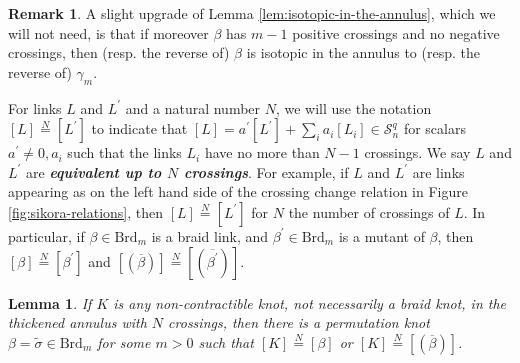 \documentclass[12pt,
	]{amsart}
\newtheorem{lemma}[theorem]{Lemma}
\theoremstyle{definition}
\newtheorem{remark}[theorem]{Remark}
\renewcommand{\bar}{\overline}
\renewcommand{\tilde}{\widetilde}
\newcommand{\mrm}[1]{\mathrm{#1}}
\newcommand{\mcal}[1]{\mathcal{#1}}
\newcommand{\lp}{\left(}\newcommand{\rp}{\right)}
\newcommand{\define}[1]{{\textit{\textbf{#1}}}}
\newcommand{\class}[1]{\left[#1\right]}
\newcommand{\rev}[1]{\bar{#1}}
\newcommand{\lift}[1]{\tilde{#1}}
\newcommand{\sk}{\mcal{S}_n^q}
\newcommand{\braid}{\mrm{Brd}}
\newcommand{\indeq}{\overset{N}{=}}
\begin{document}
\begin{remark}
A slight upgrade of Lemma \ref{lem:isotopic-in-the-annulus}, which we will not need, is that if moreover $\beta$ has $m-1$ positive crossings and no negative crossings, then (resp. the reverse of) $\beta$ is isotopic in the annulus to (resp. the reverse of) $\gamma_m$.    
\end{remark}

For links $L$ and $L^\prime$ and a natural number $N$, we will use the notation $\class{L}\indeq\class{L^\prime}$ to indicate that $\class{L}=a^\prime\class{L^\prime}+\sum_i a_i\class{L_i}\in\sk$ for scalars $a^\prime\neq0,a_i$ such that the links $L_i$ have no more than $N-1$ crossings.    We say $L$ and $L^\prime$ are \define{equivalent up to $N$ crossings}.  For example, if $L$ and $L^\prime$ are links appearing as on the left hand side of the crossing change relation in Figure \ref{fig:sikora-relations}, then $\class{L}\indeq\class{L^\prime}$ for $N$ the number of crossings of $L$.  In particular, if $\beta\in\braid_m$ is a braid link, and $\beta^\prime\in\braid_m$ is a mutant of $\beta$, then $\class{\beta}\indeq\class{\beta^\prime}$ and $\class{\lp\rev{\beta}\rp}\indeq\class{\lp\rev{\beta^\prime}\rp}$.  

\begin{lemma}\label{lem:annulus-lemma}
If $K$ is any non-contractible knot, not necessarily a braid knot, in the thickened annulus with $N$ crossings, then there is a permutation knot $\beta=\lift{\sigma}\in\braid_m$ for some $m>0$ such that $\class{K}\indeq\class{\beta}$ or $\class{K}\indeq\class{\lp\rev{\beta}\rp}$.  
\end{lemma}
\end{document}

